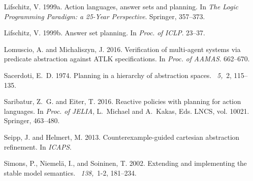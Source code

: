 \documentclass{new_tlp}
\begin{document}
\begin{thebibliography}{}
{\sc Lifschitz, V.} 1999a.
\newblock Action languages, answer sets and planning.
\newblock In {\em The Logic Programming Paradigm: a 25-Year Perspective}.
  Springer, 357--373.

{\sc Lifschitz, V.} 1999b.
\newblock Answer set planning.
\newblock In {\em Proc. of ICLP}. 23--37.

{\sc Lomuscio, A.} {\sc and} {\sc Michaliszyn, J.} 2016.
\newblock Verification of multi-agent systems via predicate abstraction against
  {ATLK} specifications.
\newblock In {\em Proc. of AAMAS}. 662--670.

{\sc Sacerdoti, E.~D.} 1974.
\newblock Planning in a hierarchy of abstraction spaces.
~{\em 5,\/}~2, 115--135.

{\sc Saribatur, Z.~G.} {\sc and} {\sc Eiter, T.} 2016.
\newblock Reactive policies with planning for action languages.
\newblock In {\em Proc. of JELIA}, {L.~Michael} {and} {A.~Kakas}, Eds. LNCS,
  vol. 10021. Springer, 463--480.

{\sc Seipp, J.} {\sc and} {\sc Helmert, M.} 2013.
\newblock Counterexample-guided cartesian abstraction refinement.
\newblock In {\em ICAPS}.

{\sc Simons, P.}, {\sc Niemel{\"a}, I.}, {\sc and} {\sc Soininen, T.} 2002.
\newblock Extending and implementing the stable model semantics.
~{\em 138,\/}~1-2, 181--234.

\end{thebibliography}

\label{lastpage}
\end{document}
